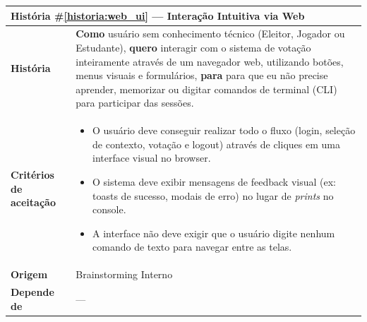 \documentclass[12pt,a4paper]{article}
\newcounter{historia}
\begin{document}
\label{historia:web_ui}
\begin{table}[H]
    \centering
    \begin{tabular}{|m{4.5cm} | m{11cm}|}
    \hline
    \multicolumn{2}{|l|}{\textbf{História \#\ref{historia:web_ui} --- Interação Intuitiva via Web}} \\
    \hline  \textbf{História} &
    \textbf{Como} usuário sem conhecimento técnico (Eleitor, Jogador ou Estudante), \newline
    \textbf{quero} interagir com o sistema de votação inteiramente através de um navegador web, utilizando botões, menus visuais e formulários,\newline  
    \textbf{para} para que eu não precise aprender, memorizar ou digitar comandos de terminal (CLI) para participar das sessões. \\
    \textbf{Critérios de aceitação} &
    \begin{itemize}
        \item{O usuário deve conseguir realizar todo o fluxo (login, seleção de contexto, votação e logout) através de cliques em uma interface visual no browser.}
        \item{O sistema deve exibir mensagens de feedback visual (ex: toasts de sucesso, modais de erro) no lugar de \textit{prints} no console.}
        \item{A interface não deve exigir que o usuário digite nenhum comando de texto para navegar entre as telas.}
    \end{itemize}\\
    \textbf{Origem}& Brainstorming Interno\\
    \textbf{Depende de}& --- \\
    \hline
    \end{tabular}
\end{table}
\end{document}

